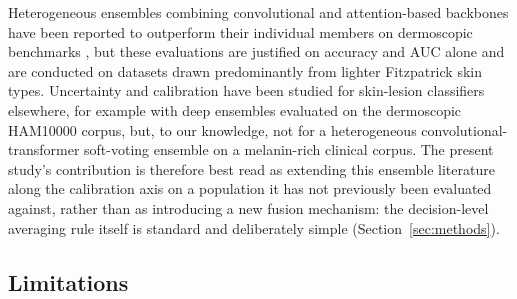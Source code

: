 \documentclass[VANCOUVER,twocolumn]{USG}
\begin{document}
Heterogeneous ensembles combining convolutional and attention-based
backbones have been reported to outperform their individual members on
dermoscopic benchmarks \cite{ref12,ref13,ref14,ref15,ref16,ref17}, but
these evaluations are justified on accuracy and AUC alone and are
conducted on datasets drawn predominantly from lighter Fitzpatrick skin
types. Uncertainty and calibration have been studied for skin-lesion
classifiers elsewhere, for example with deep ensembles evaluated on the
dermoscopic HAM10000 corpus,
but, to our knowledge, not for a heterogeneous convolutional-transformer
soft-voting ensemble on a melanin-rich clinical corpus. The present
study's contribution is therefore best read as extending this ensemble
literature along the calibration axis on a population it has not
previously been evaluated against, rather than as introducing a new fusion
mechanism: the decision-level averaging rule itself is standard and
deliberately simple (Section~\ref{sec:methods}).

\subsection{Limitations}
\end{document}
